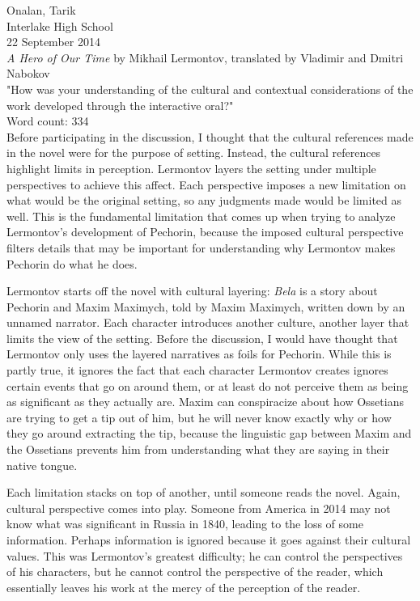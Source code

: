 \documentclass{article}
\begin{document}
    \noindent{}Onalan, Tarik \\
    Interlake High School \\
    22 September 2014 \\

    \noindent\textit{A Hero of Our Time} by Mikhail Lermontov, translated by Vladimir and Dmitri Nabokov \\

    \noindent"How was your understanding of the cultural and contextual considerations of
    the work developed through the interactive oral?" \\

    \noindent{}Word count: 334\\

    Before participating in the discussion, I thought that the cultural references
    made in the novel were for the purpose of setting. Instead, the cultural references
    highlight limits in perception. Lermontov layers the setting under multiple
    perspectives to achieve this affect. Each perspective imposes a new limitation
    on what would be the original setting, so any judgments made would be limited
    as well. This is the fundamental limitation that comes up when trying to analyze
    Lermontov's development of Pechorin, because the imposed cultural perspective
    filters details that may be important for understanding why Lermontov makes
    Pechorin do what he does.

    Lermontov starts off the novel with cultural layering: \textit{Bela} is a story
    about Pechorin and Maxim Maximych, told by Maxim Maximych, written down by an
    unnamed narrator. Each character introduces another culture, another layer
    that limits the view of the setting. Before the discussion, I would have thought
    that Lermontov only uses the layered narratives as foils for Pechorin. While
    this is partly true, it ignores the fact that each character Lermontov creates
    ignores certain events that go on around them, or at least do not perceive them
    as being as significant as they actually are. Maxim can conspiracize about how
    Ossetians are trying to get a tip out of him, but he will never know exactly
    why or how they go around extracting the tip, because the linguistic gap between
    Maxim and the Ossetians prevents him from understanding what they are saying in
    their native tongue.

    Each limitation stacks on top of another, until someone reads the novel. Again,
    cultural perspective comes into play. Someone from America in 2014 may not
    know what was significant in Russia in 1840, leading to the loss of some information.
    Perhaps information is ignored because it goes against their cultural values.
    This was Lermontov's greatest difficulty; he can control the perspectives of
    his characters, but he cannot control the perspective of the reader, which
    essentially leaves his work at the mercy of the perception of the reader.
\end{document}
